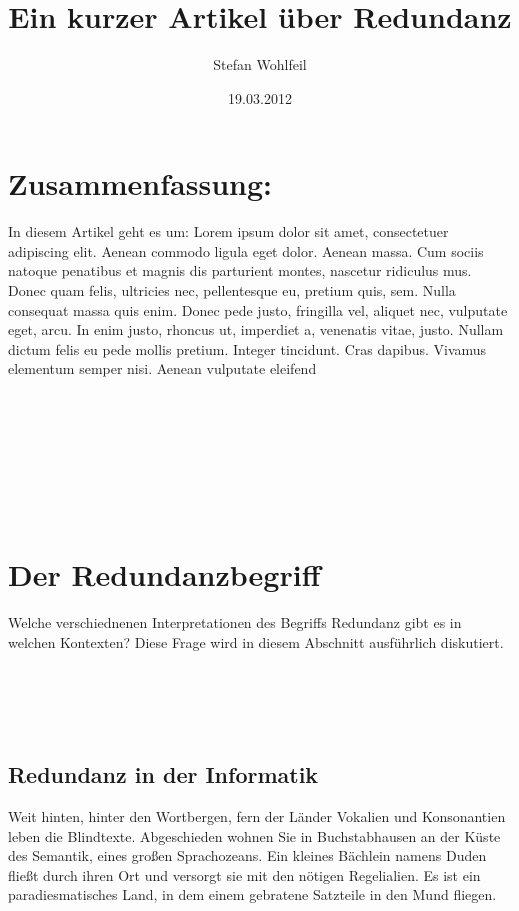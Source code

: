 \documentclass[a4paper,11pt]{article}
\title{Ein kurzer Artikel über Redundanz}
\author{Stefan Wohlfeil}
\date{19.03.2012}
\begin{document}
\maketitle 
\section{Zusammenfassung:}
In diesem Artikel geht es um:
Lorem ipsum dolor sit amet, consectetuer adipiscing elit.
Aenean commodo ligula eget dolor.
 Aenean massa.
Cum sociis natoque penatibus et magnis dis parturient montes,
nascetur ridiculus mus.
Donec quam felis, ultricies nec, pellentesque eu, pretium quis, sem.
Nulla consequat massa quis enim.
Donec pede justo, fringilla vel, aliquet nec, vulputate eget, arcu.
In enim justo, rhoncus ut, imperdiet a, venenatis vitae, justo.
Nullam dictum felis eu pede mollis pretium.
Integer tincidunt.
Cras dapibus.
Vivamus elementum semper nisi.
Aenean vulputate eleifend \\ \\
\\ \\
\\ \\
\\ \\

\tableofcontents 

\section{Der Redundanzbegriff}

Welche verschiednenen Interpretationen des Begriffs Redundanz gibt es
in welchen Kontexten?
Diese Frage wird in diesem Abschnitt ausführlich diskutiert. \\
\\ \\
\\ \\
\subsection{ Redundanz in der Informatik}\label{sec}

Weit hinten, hinter den Wortbergen, fern der Länder Vokalien und
Konsonantien leben die Blindtexte.
Abgeschieden wohnen Sie in Buchstabhausen an der Küste des
Semantik, eines großen Sprachozeans.
Ein kleines Bächlein namens Duden fließt durch ihren Ort und
versorgt sie mit den nötigen Regelialien.
Es ist ein paradiesmatisches Land, in dem einem gebratene Satzteile
in den Mund fliegen.
\end{document}
